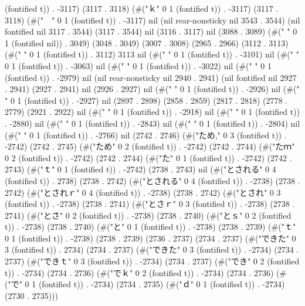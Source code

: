 (fontified t)) . -3117) (3117 . 3118) (#("ｋ" 0 1 (fontified t)) . -3117) (3117 . 3118) (#("　" 0 1 (fontified t)) . -3117) nil (nil rear-nonsticky nil 3543 . 3544) (nil fontified nil 3117 . 3544) (3117 . 3544) nil (3116 . 3117) nil (3088 . 3089) (#(" " 0 1 (fontified nil)) . 3049) (3048 . 3049) (3007 . 3008) (2965 . 2966) (3112 . 3113) (#(" " 0 1 (fontified t)) . 3112) 3113 nil (#("
" 0 1 (fontified t)) . -3101) nil (#("
" 0 1 (fontified t)) . -3063) nil (#("
" 0 1 (fontified t)) . -3022) nil (#("
" 0 1 (fontified t)) . -2979) nil (nil rear-nonsticky nil 2940 . 2941) (nil fontified nil 2927 . 2941) (2927 . 2941) nil (2926 . 2927) nil (#("
" 0 1 (fontified t)) . -2926) nil (#("
" 0 1 (fontified t)) . -2927) nil (2897 . 2898) (2858 . 2859) (2817 . 2818) (2778 . 2779) (2921 . 2922) nil (#("
" 0 1 (fontified t)) . -2918) nil (#("
" 0 1 (fontified t)) . -2880) nil (#("
" 0 1 (fontified t)) . -2843) nil (#("
" 0 1 (fontified t)) . -2804) nil (#("
" 0 1 (fontified t)) . -2766) nil (2742 . 2746) (#("ため," 0 3 (fontified t)) . -2742) (2742 . 2745) (#("ため" 0 2 (fontified t)) . -2742) (2742 . 2744) (#("たｍ" 0 2 (fontified t)) . -2742) (2742 . 2744) (#("た" 0 1 (fontified t)) . -2742) (2742 . 2743) (#("ｔ" 0 1 (fontified t)) . -2742) (2738 . 2743) nil (#("とされる" 0 4 (fontified t)) . 2738) (2738 . 2742) (#("とされる" 0 4 (fontified t)) . -2738) (2738 . 2742) (#("とされｒ" 0 4 (fontified t)) . -2738) (2738 . 2742) (#("とされ" 0 3 (fontified t)) . -2738) (2738 . 2741) (#("とさｒ" 0 3 (fontified t)) . -2738) (2738 . 2741) (#("とさ" 0 2 (fontified t)) . -2738) (2738 . 2740) (#("とｓ" 0 2 (fontified t)) . -2738) (2738 . 2740) (#("と" 0 1 (fontified t)) . -2738) (2738 . 2739) (#("ｔ" 0 1 (fontified t)) . -2738) (2738 . 2739) (2736 . 2737) (2734 . 2737) (#("できた" 0 3 (fontified t)) . 2734) (2734 . 2737) (#("できた" 0 3 (fontified t)) . -2734) (2734 . 2737) (#("できｔ" 0 3 (fontified t)) . -2734) (2734 . 2737) (#("でき" 0 2 (fontified t)) . -2734) (2734 . 2736) (#("でｋ" 0 2 (fontified t)) . -2734) (2734 . 2736) (#("で" 0 1 (fontified t)) . -2734) (2734 . 2735) (#("ｄ" 0 1 (fontified t)) . -2734) (2730 . 2735)))
